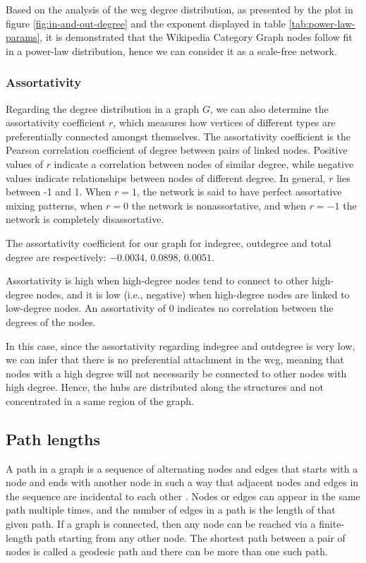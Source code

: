 Based on the analysis of the \gls{wcg} degree distribution, as presented by the plot in figure \ref{fig:in-and-out-degree} and the exponent displayed in table \ref{tab:power-law-params}, it is demonstrated that the Wikipedia Category Graph nodes follow fit in a power-law distribution, hence we can consider it as a scale-free network.  

\subsubsection{\hspace*{3pt} Assortativity}

Regarding the degree distribution in a graph $G$, we can also determine the assortativity coefficient $r$, which measures how vertices of different types are preferentially connected amongst themselves. The assortativity coefficient \cite{newman2003mixing} is the Pearson correlation coefficient of degree between pairs of linked nodes. Positive values of $r$ indicate a correlation between nodes of similar degree, while negative values indicate relationships between nodes of different degree. In general, $r$ lies between -1 and 1. When $r = 1$, the network is said to have perfect assortative mixing patterns, when $r = 0$ the network is non\-assortative, and when  $r=-1$ the network is completely disassortative.

The assortativity coefficient for our graph for indegree, outdegree and total degree are  respectively: 
$-0.0034$, $0.0898$, $0.0051$. 

Assortativity is high when high-degree nodes tend to connect to other high-degree nodes, and it is low (i.e., negative) when high-degree nodes are linked to low-degree nodes. An assortativity of 0 indicates no correlation between the degrees of the nodes.

In this case, since the assortativity regarding indegree and outdegree is very low, we can infer that there is no preferential attachment in the \gls{wcg}, meaning that nodes with a high degree will not necessarily be connected to other nodes with high degree.  Hence, the hubs are distributed along the structures and not concentrated in a same region of the graph.


\subsection{\hspace*{3pt} Path lengths}

A path in a graph is a sequence of alternating nodes and edges that starts with a node and ends with another node in such a way that adjacent nodes and edges in the sequence are incidental to each other \cite{newman2010networks}. Nodes or edges can appear in the same path multiple times, and the number of edges in a path is the length of that given path. If a graph is connected, then any node can be reached via a finite-length path starting from any other node. The shortest path between a pair of nodes is called a geodesic path and there can be more than one such path.

